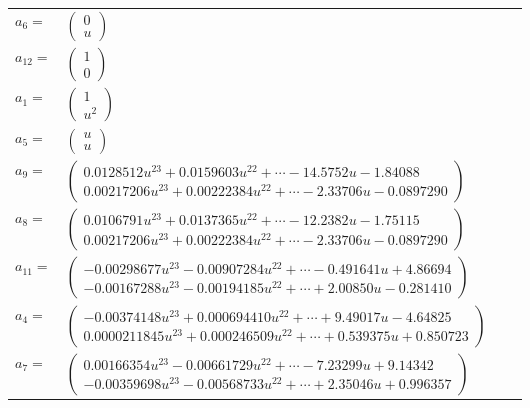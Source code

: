 \documentclass[1p]{elsarticle_modified}
\theoremstyle{definition}
\begin{document}
\begin{tabular}{m{7pt} m{180pt} m{7pt} m{180pt} }
\flushright $a_{6}=$&$\begin{pmatrix}0\\u\end{pmatrix}$ \\
\flushright $a_{12}=$&$\begin{pmatrix}1\\0\end{pmatrix}$ \\
\flushright $a_{1}=$&$\begin{pmatrix}1\\u^2\end{pmatrix}$ \\
\flushright $a_{5}=$&$\begin{pmatrix}u\\u\end{pmatrix}$ \\
\flushright $a_{9}=$&$\begin{pmatrix}0.0128512 u^{23}+0.0159603 u^{22}+\cdots-14.5752 u-1.84088\\0.00217206 u^{23}+0.00222384 u^{22}+\cdots-2.33706 u-0.0897290\end{pmatrix}$ \\
\flushright $a_{8}=$&$\begin{pmatrix}0.0106791 u^{23}+0.0137365 u^{22}+\cdots-12.2382 u-1.75115\\0.00217206 u^{23}+0.00222384 u^{22}+\cdots-2.33706 u-0.0897290\end{pmatrix}$ \\
\flushright $a_{11}=$&$\begin{pmatrix}-0.00298677 u^{23}-0.00907284 u^{22}+\cdots-0.491641 u+4.86694\\-0.00167288 u^{23}-0.00194185 u^{22}+\cdots+2.00850 u-0.281410\end{pmatrix}$ \\
\flushright $a_{4}=$&$\begin{pmatrix}-0.00374148 u^{23}+0.000694410 u^{22}+\cdots+9.49017 u-4.64825\\0.0000211845 u^{23}+0.000246509 u^{22}+\cdots+0.539375 u+0.850723\end{pmatrix}$ \\
\flushright $a_{7}=$&$\begin{pmatrix}0.00166354 u^{23}-0.00661729 u^{22}+\cdots-7.23299 u+9.14342\\-0.00359698 u^{23}-0.00568733 u^{22}+\cdots+2.35046 u+0.996357\end{pmatrix}$ \\

\end{tabular}
\end{document}

